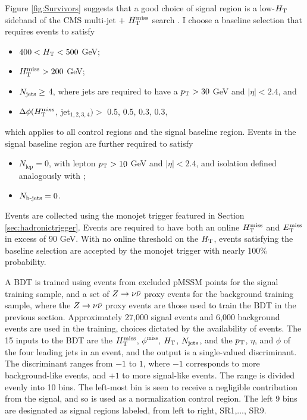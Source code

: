 Figure \ref{fig:Survivors} suggests that a good choice of signal region is a low-$H_{\rm T}$ sideband of the CMS multi-jet $+$ $H_{\text{T}}^{\rm miss}$ search \cite{Khachatryan:2016kdk}. I choose a baseline selection that requires events to satisfy
\begin{itemize}
\item $400<H_{\rm T}<500$ GeV;
\item $H_{\text{T}}^{\rm miss}>200$ GeV;
\item $N_{\rm jets}\geq$ 4, where jets are required to have a $p_{\text{T}}>30$ GeV and $|\eta|<2.4$, and
\item $\Delta\phi(H_{\text{T}}^{\rm miss}$, jet$_{1,2,3,4})>$ 0.5, 0.5, 0.3, 0.3,
\end{itemize}
which applies to all control regions and the signal baseline region. Events in the signal baseline region are further required to satisfy 
\begin{itemize}
\item $N_{\text{lep}}=0$, with lepton $p_{\text{T}}>10$ GeV and $|\eta|<2.4$, and isolation defined analogously with  \cite{Khachatryan:2016kdk};
\item $N_{\text{b-jets}}=0$.
\end{itemize}

Events are collected using the monojet trigger featured in Section \ref{sec:hadronictrigger}. Events are required to have both an online $H_{\text{T}}^{\rm miss}$ and $E_{\text{T}}^{\rm miss}$ in excess of 90 GeV. With no online threshold on the $H_{\rm T}$, events satisfying the baseline selection are accepted by the monojet trigger with nearly 100\% probability.

A BDT is trained using events from excluded pMSSM points for the signal training sample, and a set of $Z\rightarrow \nu\bar{\nu}$ proxy events for the background training sample, where the $Z\rightarrow \nu\bar{\nu}$ proxy events are those used to train the BDT in the previous section. Approximately 27,000 signal events and 6,000 background events are used in the training, choices dictated by the availability of events. The 15 inputs to the BDT are the $H_{\text{T}}^{\rm miss}$, $\phi^{\text{miss}}$, $H_{\rm T}$, $N_{\rm jets}$, and the $p_{\text{T}}$, $\eta$, and $\phi$ of the four leading jets in an event, and the output is a single-valued discriminant. The discriminant ranges from $-1$ to $1$, where $-1$ corresponds to more background-like events, and $+1$ to more signal-like events. The range is divided evenly into 10 bins. The left-most bin is seen to receive a negligible contribution from the signal, and so is used as a normalization control region. The left 9 bins are designated as signal regions labeled, from left to right, SR1,..., SR9.

